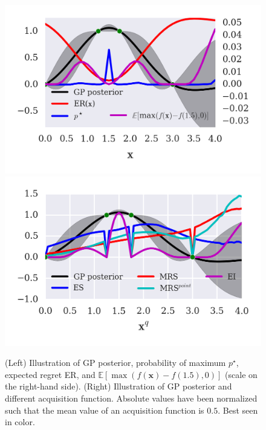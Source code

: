 \documentclass[10pt,letterpaper]{article} %
\begin{document}
\begin{figure}
\centering
\includegraphics{regret_illustration}
\includegraphics{acq_comparison}
\caption{(Left) Illustration of GP posterior, probability of maximum $p^\star$, expected regret ER, and  $\mathbb{E}[\max(f(\mathbf{x}) - f(1.5), 0)]$ (scale on the right-hand side). (Right) Illustration of GP posterior and different acquisition function. Absolute values have been normalized such that the mean value of an acquisition function is $0.5$. Best seen in color.}
\label{fig:MRS_illustration}
\end{figure}
\end{document}
